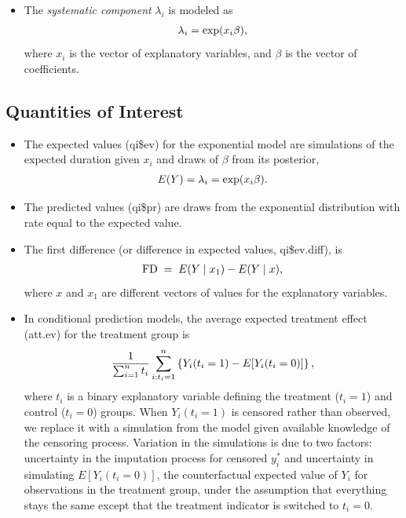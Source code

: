 \documentclass[letterpaper,10pt,english]{sphinxmanual}
\begin{document}
\begin{itemize}
\item {} 
The \emph{systematic component} \(\lambda_i\) is modeled as
\begin{gather}
\begin{split}\lambda_i = \exp(x_i \beta),\end{split}\notag
\end{gather}
where \(x_i\) is the vector of explanatory variables, and
\(\beta\) is the vector of coefficients.

\end{itemize}


\subsection{Quantities of Interest}
\label{vignette:quantities-of-interest}\begin{itemize}
\item {} 
The expected values (qi\$ev) for the exponential model are simulations
of the expected duration given \(x_i\) and draws of \(\beta\)
from its posterior,
\begin{gather}
\begin{split}E(Y) = \lambda_i = \exp(x_i \beta).\end{split}\notag
\end{gather}
\item {} 
The predicted values (qi\$pr) are draws from the exponential
distribution with rate equal to the expected value.

\item {} 
The first difference (or difference in expected values, qi\$ev.diff),
is
\begin{gather}
\begin{split}\textrm{FD} \; = \; E(Y \mid x_1) - E(Y \mid x),\end{split}\notag
\end{gather}
where \(x\) and \(x_1\) are different vectors of values for
the explanatory variables.

\item {} 
In conditional prediction models, the average expected treatment
effect (att.ev) for the treatment group is
\begin{gather}
\begin{split}\frac{1}{\sum_{i=1}^n t_i}\sum_{i:t_i=1}^n \left\{ Y_i(t_i=1) - E[Y_i(t_i=0)]
  \right\},\end{split}\notag
\end{gather}
where \(t_i\) is a binary explanatory variable defining the
treatment (\(t_i=1\)) and control (\(t_i=0\)) groups. When
\(Y_i(t_i=1)\) is censored rather than observed, we replace it
with a simulation from the model given available knowledge of the
censoring process. Variation in the simulations is due to two
factors: uncertainty in the imputation process for censored
\(y_i^*\) and uncertainty in simulating \(E[Y_i(t_i=0)]\),
the counterfactual expected value of \(Y_i\) for observations in
the treatment group, under the assumption that everything stays the
same except that the treatment indicator is switched to
\(t_i=0\).


\end{itemize}
\end{document}

